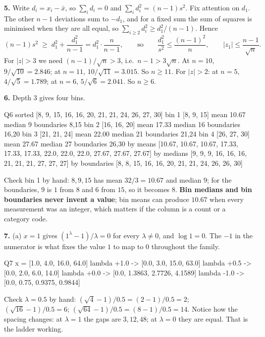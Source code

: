 \documentclass[11pt]{article}
\begin{document}
\medskip
\textbf{5.} Write $d_i = x_i - \bar x$, so $\sum_i d_i = 0$ and
$\sum_i d_i^2 = (n-1)s^2$. Fix attention on $d_1$. The other $n-1$ deviations
sum to $-d_1$, and for a fixed sum the sum of squares is minimised when they
are all equal, so $\sum_{i\ge2} d_i^2 \ge d_1^2/(n-1)$. Hence
\[
  (n-1)s^2 \;\ge\; d_1^2 + \frac{d_1^2}{n-1} = d_1^2 \cdot \frac{n}{n-1},
  \qquad\text{so}\qquad
  \frac{d_1^2}{s^2} \le \frac{(n-1)^2}{n},
  \qquad |z_1| \le \frac{n-1}{\sqrt n}.
\]
For $|z| > 3$ we need $(n-1)/\sqrt n > 3$, i.e.\ $n - 1 > 3\sqrt n$. At
$n = 10$, $9/\sqrt{10} = 2.846$; at $n = 11$, $10/\sqrt{11} = 3.015$. So
\textbf{$n \ge 11$}. For $|z| > 2$: at $n = 5$, $4/\sqrt5 = 1.789$; at $n = 6$,
$5/\sqrt6 = 2.041$. So $n \ge 6$.

\medskip
\textbf{6.} Depth $3$ gives four bins.

\begin{codeout}
Q6  sorted [8, 9, 15, 16, 16, 20, 21, 21, 24, 26, 27, 30]
    bin 1 [8, 9, 15]     mean  10.67  median  9  boundaries  8,15
    bin 2 [16, 16, 20]   mean  17.33  median 16  boundaries 16,20
    bin 3 [21, 21, 24]   mean  22.00  median 21  boundaries 21,24
    bin 4 [26, 27, 30]   mean  27.67  median 27  boundaries 26,30
    by means      [10.67, 10.67, 10.67, 17.33, 17.33, 17.33, 22.0, 22.0, 22.0, 27.67, 27.67, 27.67]
    by medians    [9, 9, 9, 16, 16, 16, 21, 21, 21, 27, 27, 27]
    by boundaries [8, 8, 15, 16, 16, 20, 21, 21, 24, 26, 26, 30]
\end{codeout}

Check bin 1 by hand: $8, 9, 15$ has mean $32/3 = 10.67$ and median $9$; for the
boundaries, $9$ is $1$ from $8$ and $6$ from $15$, so it becomes $8$.
\textbf{Bin medians and bin boundaries never invent a value}; bin means can
produce $10.67$ when every measurement was an integer, which matters if the
column is a count or a category code.

\medskip
\textbf{7.} (a) $x = 1$ gives $(1^\lambda - 1)/\lambda = 0$ for every
$\lambda \neq 0$, and $\log 1 = 0$. The $-1$ in the numerator is what fixes the
value $1$ to map to $0$ throughout the family.

\begin{codeout}
Q7  x = [1.0, 4.0, 16.0, 64.0]
    lambda +1.0 -> [0.0, 3.0, 15.0, 63.0]
    lambda +0.5 -> [0.0, 2.0, 6.0, 14.0]
    lambda +0.0 -> [0.0, 1.3863, 2.7726, 4.1589]
    lambda -1.0 -> [0.0, 0.75, 0.9375, 0.9844]
\end{codeout}

Check $\lambda = 0.5$ by hand: $(\sqrt{4} - 1)/0.5 = (2-1)/0.5 = 2$;
$(\sqrt{16}-1)/0.5 = 6$; $(\sqrt{64}-1)/0.5 = (8-1)/0.5 = 14$. Notice how the
spacing changes: at $\lambda = 1$ the gaps are $3, 12, 48$; at $\lambda = 0$
they are equal. That is the ladder working.
\end{document}

